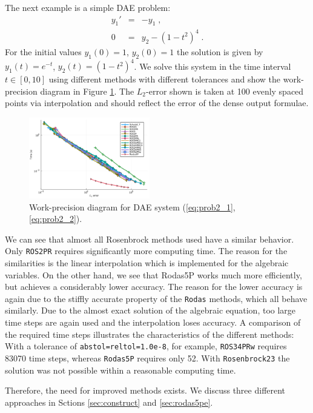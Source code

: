 \documentclass{juliacon}
\begin{document}
The next example is a simple DAE problem:
\begin{eqnarray}
y_1' &=& -y_1  \; ,\label{eq:prob2_1}\\
0 &=& y_2 -(1-t^2)^4 \; .\label{eq:prob2_2}
\end{eqnarray}
For the initial values $y_1(0)=1$, $y_2(0)=1$ the solution is given by 
$y_1(t)= e^{-t}$, $y_2(t)=(1-t^2)^4$. We solve this system in the time interval $t \in [0,10]$ 
using different methods with different tolerances and show the work-precision diagram in Figure \ref{fig:bench1}.
The $L_2$-error shown is taken at 100 evenly spaced points via interpolation and should reflect the error of the dense output formulae.
\begin{figure}[t]
 \centering
 \includegraphics[width=0.47\textwidth]{Abb_2.pdf}
 \caption{Work-precision diagram for DAE system (\ref{eq:prob2_1},\ref{eq:prob2_2}).}\label{fig:bench1}
\end{figure}
We can see that almost all Rosenbrock methods used have a similar behavior. Only \verb|ROS2PR| requires significantly more computing time.
The reason for the similarities is the linear interpolation which is implemented for the algebraic variables.
On the other hand, we see that Rodas5P works much more efficiently, but achieves a considerably lower accuracy. 
The reason for the lower accuracy is again due to the stiffly accurate property of the \verb|Rodas| methods, which all behave similarly. 
Due to the almost exact solution of the algebraic equation, too large time steps are again used and the interpolation loses accuracy.
A comparison of the required time steps illustrates the characteristics of the different methods: 
With a tolerance of \verb|abstol=reltol=1.0e-8|, for example, \verb|ROS34PRw| requires 83070 time steps, whereas \verb|Rodas5P| requires only 52.
With \verb|Rosenbrock23| the solution was not possible within a reasonable computing time.


Therefore, the need for improved methods exists. We discuss three different approaches in Sctions \ref{sec:construct} and \ref{sec:rodas5pe}.
\end{document}
